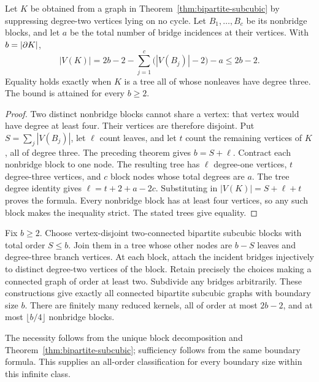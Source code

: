 \begin{theorem}\label{thm:bipartite-kernel-bound}
Let $K$ be obtained from a graph in Theorem~\ref{thm:bipartite-subcubic} by
suppressing degree-two vertices lying on no cycle. Let $B_1,\ldots,B_c$ be
its nonbridge blocks, and let $a$ be the total number of bridge incidences
at their vertices. With $b=|\partial K|$,
\[
 |V(K)|=2b-2-\sum_{j=1}^c\bigl(|V(B_j)|-2\bigr)-a\le2b-2.
\]
Equality holds exactly when $K$ is a tree all of whose nonleaves have
degree three. The bound is attained for every $b\ge2$.
\end{theorem}
\begin{proof}
Two distinct nonbridge blocks cannot share a vertex: that vertex would
have degree at least four. Their vertices are therefore disjoint. Put
$S=\sum_j|V(B_j)|$, let $\ell$ count leaves, and let $t$ count the remaining
vertices of $K$, all of degree three. The preceding theorem gives
$b=S+\ell$. Contract each nonbridge block to one node. The resulting tree
has $\ell$ degree-one vertices, $t$ degree-three vertices, and $c$ block
nodes whose total degrees are $a$. The tree degree identity gives
$\ell=t+2+a-2c$. Substituting in $|V(K)|=S+\ell+t$ proves the formula.
Every nonbridge block has at least four vertices, so any such block makes
the inequality strict. The stated trees give equality.
\end{proof}


\begin{corollary}
Fix $b\ge2$. Choose vertex-disjoint two-connected bipartite subcubic blocks
with total order $S\le b$. Join them in a tree whose other nodes are
$b-S$ leaves and degree-three branch vertices. At each block, attach the
incident bridges injectively to distinct degree-two vertices of the block.
Retain precisely the choices making a connected graph of order at least
two. Subdivide any bridges arbitrarily. These constructions give exactly
all connected bipartite subcubic graphs with boundary size $b$.
There are finitely many reduced kernels, all of order at most $2b-2$,
and at most $\lfloor b/4\rfloor$ nonbridge blocks.
\end{corollary}
The necessity follows from the unique block decomposition and
Theorem~\ref{thm:bipartite-subcubic}; sufficiency follows from the same
boundary formula. This supplies an all-order classification for every
boundary size within this infinite class.

